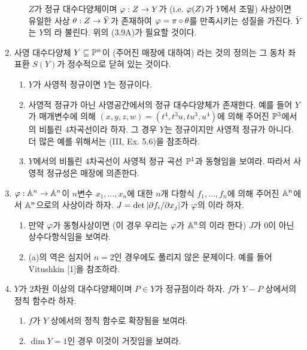 \begin{enumerate}[label=\tb{3.\arabic*.},itemindent=0mm,itemsep=2mm]
\begin{enumerate}[label=(\alph*)]
	$Z$가 정규 대수다양체이며 $\varphi:Z\rightarrow Y$가 (i.e. $\varphi(Z)$가 $Y$에서 조밀) 사상이면
	유일한 사상 $\theta:Z\rightarrow\bar Y$가 존재하여 $\varphi=\pi\circ\theta$를 만족시키는 성질을 가진다.
	$\bar Y$는 $Y$의 라 불린다. 위의 (3.9A)가 필요할 것이다.
	\end{enumerate}
	\item {} 사영 대수다양체 $Y\subseteq\mathbb{P}^n$이 (주어진 매장에 대하여)
	라는 것의 정의는 그 동차 좌표환 $S(Y)$가 정수적으로 닫혀 있는 것이다.
	\begin{enumerate}[label=(\alph*)]
	\item $Y$가 사영적 정규이면 $Y$는 정규이다.
	\item 사영적 정규가 아닌 사영공간에서의 정규 대수다양체가 존재한다.
	예를 들어 $Y$가 매개변수에 의해 $(x,y,z,w)=(t^4,t^3u,tu^3,u^4)$에 의해 주어진 $\mathbb{P}^3$에서의 비틀린 4차곡선이라 하자.
	그 경우 $Y$는 정규이지만 사영적 정규가 아니다. 더 많은 예를 위해서는 (III, Ex. 5.6)을 참조하라.
	\item $Y$에서의 비틀린 4차곡선이 사영적 정규 곡선 $\mathbb{P}^1$과 동형임을 보여라. 따라서 사영적 정규성은 매장에 의존한다.
	\end{enumerate}
	\item {} $\varphi:\mathbb{A}^n\rightarrow\mathbb{A}^n$이 $n$변수 $x_1,\ldots,x_n$에 대한
	$n$개 다항식 $f_1,\ldots,f_n$에 의해 주어진 $\mathbb{A}^n$에서 $\mathbb{A}^n$으로의 사상이라 하자.
	$J=\det|\partial f_i/\partial x_j|$가 $\varphi$의 이라 하자.
	\begin{enumerate}[label=(\alph*)]
	\item 만약 $\varphi$가 동형사상이면 (이 경우 우리는 $\varphi$가 $\mathbb{A}^n$의 이라 한다)
	$J$가 0이 아닌 상수다항식임을 보여라.
	\end{enumerate}
	\begin{enumerate}[label=**(\alph*)]
	\setcounter{enumii}{1}
	\item (a)의 역은 심지어 $n=2$인 경우에도 풀리지 않은 문제이다. 예를 들어 Vitushkin [1]을 참조하라.
	\end{enumerate}
	\item $Y$가 2차원 이상의 대수다양체이며 $P\in Y$가 정규점이라 하자. $f$가 $Y-P$ 상에서의 정칙 함수라 하자.
	\begin{enumerate}[label=(\alph*)]
	\item $f$가 $Y$ 상에서의 정칙 함수로 확장됨을 보여라.
	\item $\dim Y=1$인 경우 이것이 거짓임을 보여라.
	\end{enumerate}

\end{enumerate}
